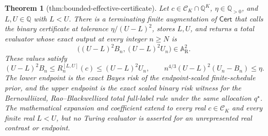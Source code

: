 \documentclass{article}
\newtheorem{theorem}{Theorem}
\begin{document}
\begin{theorem}[thm:bounded-effective-certificate]\label{thm:bounded-effective-certificate}
Let \(c\in\mathcal C_K\cap\mathbb Q^K\), \(\eta\in\mathbb Q_{>0}\), and \(L,U\in\mathbb Q\) with \(L<U\).  There is a terminating finite augmentation of \(\mathsf{Cert}\) that calls the binary certificate at tolerance \(\eta/(U-L)^2\), stores \(L,U\), and returns a total evaluator whose exact output at every integer \(n\ge N\) is
\[
\bigl((U-L)^2B_n,(U-L)^2U_n\bigr)\in\mathbb A_{\mathrm R}^2.
\]
These values satisfy
\[
(U-L)^2B_n\le R_n^{[L,U]}(c)\le (U-L)^2U_n,
\qquad
n^{4/3}(U-L)^2(U_n-B_n)\le\eta.
\]
The lower endpoint is the exact Bayes risk of the endpoint-scaled finite-schedule prior, and the upper endpoint is the exact scaled binary risk witness for the Bernoulliized, Rao--Blackwellized total full-label rule under the same allocation \(q^\star\).  The mathematical expansion and coefficient extend to every real \(c\in\mathcal C_K\) and every finite real \(L<U\), but no Turing evaluator is asserted for an unrepresented real contrast or endpoint.
\end{theorem}
\end{document}
